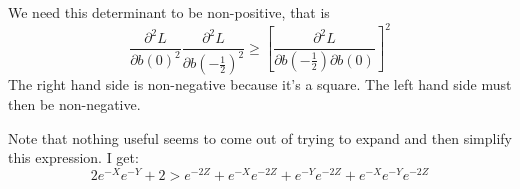 \documentclass[12pt]{article}
\begin{document}
\begin{itemize}
  We need this determinant to be non-positive, that is
		\begin{equation}
		  \frac{\partial^2 L}{\partial b(0)^2} \frac{\partial^2 L}{\partial b\left(-\frac{1}{2}\right)^2} \geq \left[\frac{\partial^2 L}{\partial b\left(-\frac{1}{2}\right)\partial b\left(0\right)}\right]^2 
			\label{eq:soc}
		\end{equation}
	  The right hand side is non-negative because it's a square. The left hand side must then be non-negative. 
\end{itemize}
Note that nothing useful seems to come out of trying to expand and then simplify this expression. I get:
\[
  2e^{-X}e^{-Y} + 2 > e^{-2Z} + e^{-X}e^{-2Z} + e^{-Y}e^{-2Z} + e^{-X}e^{-Y}e^{-2Z}
\]		
\begin{comment}
\vskip.2in		
Evaluating the constraint terms:\\
\begin{tabular}{cccc}
			0 & -1 & 0 & 0 \\
			-1 & $\frac{\partial^2 L}{\partial b\left(-\frac{1}{2}\right)^2}$ & $\frac{\partial^2 L}{\partial b(0)\partial b\left(-\frac{1}{2}\right)}$ & $\frac{\partial^2 L}{\partial b\left(\frac{1}{2}\right)\partial b\left(-\frac{1}{2}\right)}$  \\
			0 & $\frac{\partial^2 L}{\partial b\left(-\frac{1}{2}\right)\partial b\left(0\right)}$ & $\frac{\partial^2 L}{\partial b(0)^2}$ & $\frac{\partial^2 L}{\partial b\left(\frac{1}{2}\right)\partial b\left(0\right)}$ \\
			0 & $\frac{\partial^2 L}{\partial b\left(-\frac{1}{2}\right)\partial b\left(\frac{1}{2}\right)}$ & $\frac{\partial^2 L}{\partial b(0) \partial b\left(\frac{1}{2}\right)}$ & $\frac{\partial^2 L}{\partial b\left(\frac{1}{2}\right)^2}$
		\end{tabular}


\end{comment}
\end{document}
